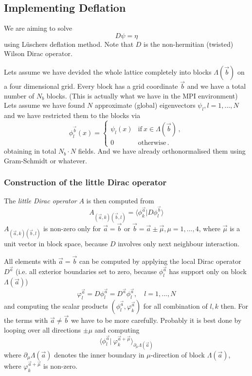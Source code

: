 \subsection{Implementing Deflation}

We are aiming to solve 
\[
D\psi = \eta
\]
using L{\"u}schers deflation method. Note that $D$ is the
non-hermitian (twisted) Wilson Dirac operator.

Lets assume we have devided the whole lattice completely into blocks
$\Lambda(\vec b)$ on a four dimensional grid. Every block has a grid
coordinate $\vec b$ and we have a total number of $N_b$ blocks. (This
is actually what we have in the MPI environment) Lets
assume we have found $N$ approximate (global) eigenvectors $\psi_l,
l=1,...,N$ and we have restricted them to the blocks via
\[
\phi_l^{\vec b}(x) =
\begin{cases}
  \psi_l(x) & \textrm{if}\ x \in \Lambda(\vec b)\, ,\\
  0 & \textrm{otherwise}\,.
\end{cases}
\]
obtaining in total $N_b\cdot N$ fields. And we have already
orthonormalised them using Gram-Schmidt or whatever.

\subsubsection*{Construction of the little Dirac operator}

The \emph{little Dirac operator} $A$ is then computed from
\[
A_{(\vec a,k)(\vec b, l)} = \langle\phi_k^{\vec a}| D\phi_l^{\vec
  b}\rangle 
\]
$A_{(\vec a,k)(\vec b, l)}$ is non-zero only for $\vec a = \vec b$ or
$\vec b = \vec a \pm \vec \mu, \mu=1,...,4$, where $\vec\mu$ is a unit
vector in block space, because $D$ involves only next neighbour
interaction. 

All elements with $\vec a = \vec b$ can be computed by applying the
local Dirac operator $D^{\vec a}$ (i.e. all exterior boundaries set to
zero, because $\phi_l^{\vec a}$ has support only on block
$\Lambda(\vec a)$)
\[
\varphi_l^{\vec a} = D \phi_l^{\vec a} = D^{\vec a} \phi_l^{\vec a},\quad
l=1,...,N 
\]
and computing the scalar products $(\phi_l^{\vec a},\varphi_k^{\vec a})$
for all combination of $l,k$ then. For the terms with $\vec a
\neq \vec b$ we have to be more carefully. Probably it is best done by
looping over all directions $\pm\mu$ and computing
\[
\langle \phi_l^{\vec a}|\ \varphi_k^{\vec a+\vec\mu}\rangle_{\partial_{\mu}\Lambda(\vec a)}
\]
where $\partial_{\mu}\Lambda(\vec a)$ denotes the inner boundary in
$\mu$-direction of block $\Lambda(\vec a)$, where $\varphi_k^{\vec
  a+\vec\mu}$ is non-zero. 

